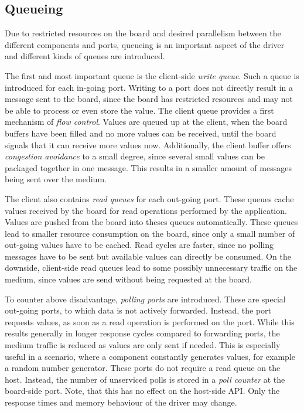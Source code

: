 \documentclass{report}
\begin{document}
\subsection{Queueing}
\label{sec:arch:queue}
Due to restricted resources on the board and desired parallelism between the different components and ports, queueing is an important aspect of the driver and different kinds of queues are introduced.

The first and most important queue is the client-side \textit{write queue}. Such a queue is introduced for each in-going port. Writing to a port does not directly result in a message sent to the board, since the board has restricted resources and may not be able to process or even store the value. The client queue provides a first mechanism of \textit{flow control}. Values are queued up at the client, when the board buffers have been filled and no more values can be received, until the board signals that it can receive more values now.
Additionally, the client buffer offers \textit{congestion avoidance} to a small degree, since several small values can be packaged together in one message. This results in a smaller amount of messages being sent over the medium.

The client also contains \textit{read queues} for each out-going port. These queues cache values received by the board for read operations performed by the application. Values are pushed from the board into theses queues automatically. These queues lead to smaller resource consumption on the board, since only a small number of out-going values have to be cached. Read cycles are faster, since no polling messages have to be sent but available values can directly be consumed. On the downside, client-side read queues lead to some possibly unnecessary traffic on the medium, since values are send without being requested at the board. 

To counter above disadvantage, \textit{polling ports} are introduced. These are special out-going ports, to which data is not actively forwarded. Instead, the port requests values, as soon as a read operation is performed on the port. While this results generally in longer response cycles compared to forwarding ports, the medium traffic is reduced as values are only sent if needed. This is especially useful in a scenario, where a component constantly generates values, for example a random number generator. These ports do not require a read queue on the host. Instead, the number of unserviced polls is stored in a \textit{poll counter} at the board-side port. Note, that this has no effect on the host-side API. Only the response times and memory behaviour of the driver may change.
\end{document}
